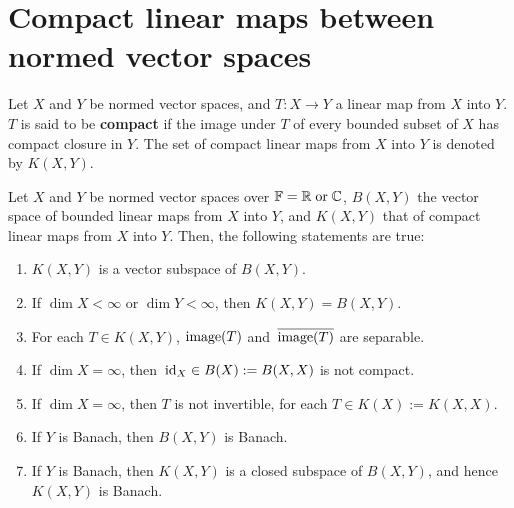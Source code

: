 

\section{Compact linear maps between normed vector spaces}
\setcounter{theorem}{0}
\setcounter{equation}{0}


\renewcommand{\theenumi}{\roman{enumi}}
\renewcommand{\labelenumi}{\textnormal{(\theenumi)}$\;\;$}


\begin{definition}\mbox{}
\vskip 0.1cm
\noindent
Let $X$ and $Y$ be normed vector spaces, and $T : X \longrightarrow Y$ a linear map from $X$ into $Y$.
$T$ is said to be \textbf{compact} if the image under $T$ of every bounded subset of $X$ has compact closure in $Y$.
The set of compact linear maps from $X$ into $Y$ is denoted by $K(X,Y)$.
\end{definition}


\begin{theorem}\mbox{}
\vskip 0.1cm
\noindent
Let $X$ and $Y$ be normed vector spaces over $\mathbb{F} = \mathbb{R} \;\textnormal{or}\; \mathbb{C}$,
$B(X,Y)$ the vector space of bounded linear maps from $X$ into $Y$,
and $K(X,Y)$ that of compact linear maps from $X$ into $Y$.
Then, the following statements are true:
\begin{enumerate}
\item
	$K(X,Y)$ is a vector subspace of $B(X,Y)$.
\item
	If $\dim X < \infty$ or $\dim Y < \infty$, then $K(X,Y) = B(X,Y)$.
\item
	For each $T \in K(X,Y)$, \;$\textnormal{image}(T)$ and \,$\overline{\textnormal{image}(T)}$ are separable.
\item
	If $\dim X = \infty$, then \,$\textnormal{id}_{X} \in B(X) := B(X,X)$ is not compact.
\item
	If $\dim X = \infty$, then $T$ is not invertible, for each $T \in K(X) := K(X,X)$.
\item
	If $Y$ is Banach, then $B(X,Y)$ is Banach.
\item
	If $Y$ is Banach, then $K(X,Y)$ is a closed subspace of $B(X,Y)$, and hence $K(X,Y)$ is Banach.
\end{enumerate}
\end{theorem}


